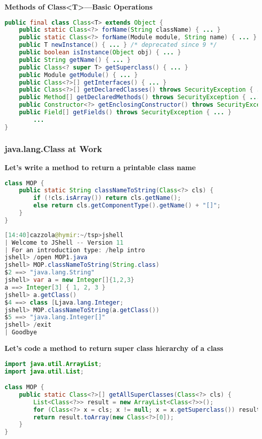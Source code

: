 \textbf{Methods of Class<T>—Basic Operations}

\begin{lstlisting}[language=Java]
public final class Class<T> extends Object {
	public static Class<?> forName(String className) { ... }
	public static Class<?> forName(Module module, String name) { ... }
	public T newInstance() { ... } /* deprecated since 9 */
	public boolean isInstance(Object obj) { ... }
	public String getName() { ... }
	public Class<? super T> getSuperclass() { ... }
	public Module getModule() { ... }
	public Class<?>[] getInterfaces() { ... }
	public Class<?>[] getDeclaredClasses() throws SecurityException { ... }
	public Method[] getDeclaredMethods() throws SecurityException { ... }
	public Constructor<?> getEnclosingConstructor() throws SecurityException { ... }
	public Field[] getFields() throws SecurityException { ... }
		...
}
\end{lstlisting}

\subsubsection{java.lang.Class at Work}

\textbf{Let's write a method to return a printable class name}

\begin{lstlisting}[language=Java]
class MOP {
	public static String classNameToString(Class<?> cls) {
		if (!cls.isArray()) return cls.getName();
		else return cls.getComponentType().getName() + "[]";
	}
}
\end{lstlisting}

\begin{lstlisting}[language=Java]
[14:40]cazzola@hymir:~/tsp>jshell
| Welcome to JShell -- Version 11
| For an introduction type: /help intro
jshell> /open MOP1.java
jshell> MOP.classNameToString(String.class)
$2 ==> "java.lang.String"
jshell> var a = new Integer[]{1,2,3}
a ==> Integer[3] { 1, 2, 3 }
jshell> a.getClass()
$4 ==> class [Ljava.lang.Integer;
jshell> MOP.classNameToString(a.getClass())
$5 ==> "java.lang.Integer[]"
jshell> /exit
| Goodbye
\end{lstlisting}

\textbf{Let’s code a method to return super class hierarchy of a class}

\begin{lstlisting}[language=Java]
import java.util.ArrayList;
import java.util.List;

class MOP {
	public static Class<?>[] getAllSuperClasses(Class<?> cls) {
		List<Class<?>> result = new ArrayList<Class<?>>();
		for (Class<?> x = cls; x != null; x = x.getSuperclass()) result.add(x) ;
		return result.toArray(new Class<?>[0]);
	}
}
\end{lstlisting}

